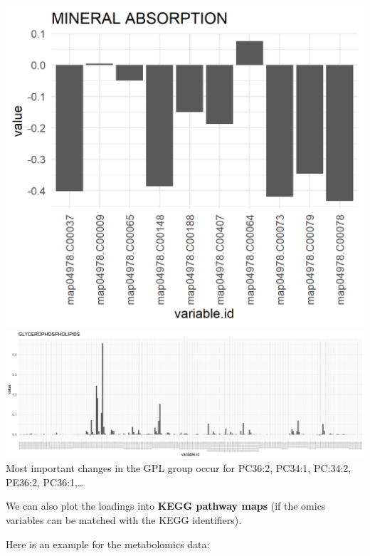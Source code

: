 \documentclass[
]{book}
\begin{document}
\includegraphics{Figs/fig5_3.png}
\includegraphics{Figs/fig5_4.png}
Most important changes in the GPL group occur for PC36:2, PC34:1, PC:34:2,
PE36:2, PC36:1,\ldots{}

We can also plot the loadings into \textbf{KEGG pathway maps} (if the omics variables
can be matched with the KEGG identifiers).

Here is an example for the metabolomics data:
\end{document}
